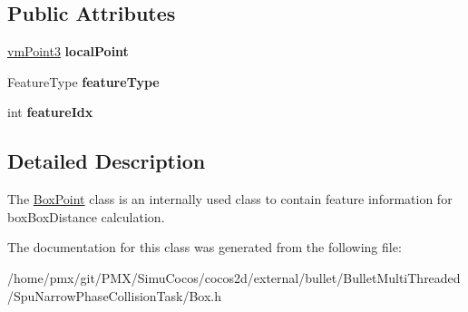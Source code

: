 \subsection*{Public Attributes}
\begin{DoxyCompactItemize}
\item 
\mbox{\label{classBoxPoint_ab630d7c127183aa378820e9c8923bf23}} 
\hyperlink{classVectormath_1_1Aos_1_1Point3}{vm\+Point3} {\bfseries local\+Point}
\item 
\mbox{\label{classBoxPoint_a5f8e28bd2da7a0c401374b17f9246084}} 
Feature\+Type {\bfseries feature\+Type}
\item 
\mbox{\label{classBoxPoint_a20eb8785d55cc6bdab7ce0207ece0b9a}} 
int {\bfseries feature\+Idx}
\end{DoxyCompactItemize}


\subsection{Detailed Description}
The \hyperlink{classBoxPoint}{Box\+Point} class is an internally used class to contain feature information for box\+Box\+Distance calculation. 

The documentation for this class was generated from the following file\+:\begin{DoxyCompactItemize}
\item 
/home/pmx/git/\+P\+M\+X/\+Simu\+Cocos/cocos2d/external/bullet/\+Bullet\+Multi\+Threaded/\+Spu\+Narrow\+Phase\+Collision\+Task/Box.\+h\end{DoxyCompactItemize}
